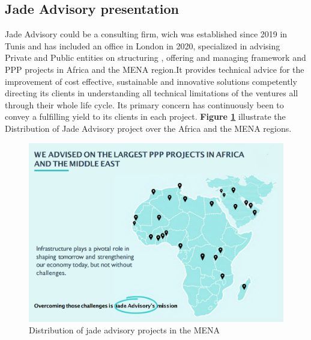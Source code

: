 \subsection{Jade Advisory presentation}
Jade Advisory could be a consulting firm, wich was established since 2019 in Tunis and has included an office in London in 2020, specialized in advising Private and Public entities on structuring , offering and managing framework and PPP projects in Africa and the MENA region.It provides technical advice for the improvement of cost effective, sustainable and innovative solutions competently directing its clients in understanding all technical limitations of the ventures all through their whole life cycle. Its primary concern has continuously been to convey a fulfilling yield to its clients in each project.
\vskip 0.5cm
\textbf{Figure \ref{fig1} }  illustrate the Distribution of Jade Advisory project over the Africa and the MENA regions.
\begin{figure}[h]
    \centering
    \includegraphics[width=0.9 \linewidth]{assets/jade-reg.png}
    \caption{Distribution of jade advisory projects in the MENA}
    \label{fig1}
\end{figure}

